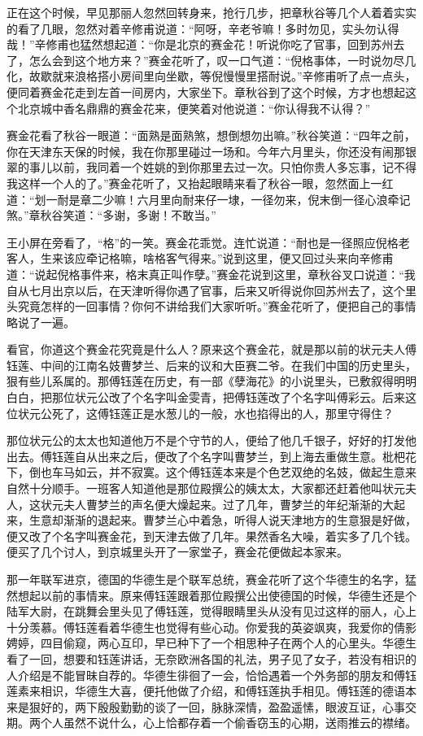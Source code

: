 \documentclass[12pt,UTF8]{ctexbook}
\begin{document}
{{{正在这个时候，早见那丽人忽然回转身来，抢行几步，把章秋谷等几个人着着实实的看了几眼，忽然对着辛修甫说道：“阿呀，辛老爷嘛！多时勿见，实头勿认得哉！”辛修甫也猛然想起道：“你是北京的赛金花！听说你吃了官事，回到苏州去了，怎么会到这个地方来？”赛金花听了，叹一口气道：“倪格事体，一时说勿尽几化，故歇就来浪格搭小房间里向坐歇，等倪慢慢里搭耐说。”辛修甫听了点一点头，便同着赛金花走到左首一间房内，大家坐下。章秋谷到了这个时候，方才也想起这个北京城中香名鼎鼎的赛金花来，便笑着对他说道：“你认得我不认得？”

赛金花看了秋谷一眼道：“面熟是面熟煞，想倒想勿出嘛。”秋谷笑道：“四年之前，你在天津东天保的时候，我在你那里碰过一场和。今年六月里头，你还没有闹那银翠的事儿以前，我同着一个姓姚的到你那里去过一次。只怕你贵人多忘事，记不得我这样一个人的了。”赛金花听了，又抬起眼睛来看了秋谷一眼，忽然面上一红道：“划一耐是章二少嘛！六月里向耐来仔一埭，一径勿来，倪末倒一径心浪牵记煞。”章秋谷笑道：“多谢，多谢！不敢当。”

王小屏在旁看了，“格”的一笑。赛金花乖觉。连忙说道：“耐也是一径照应倪格老客人，生来该应牵记格嘛，啥格客气得来。”说到这里，便又回过头来向辛修甫道：“说起倪格事件来，格末真正叫作孽。”赛金花说到这里，章秋谷叉口说道：“我自从七月出京以后，在天津听得你遇了官事，后来又听得说你回苏州去了，这个里头究竟怎样的一回事情？你何不讲给我们大家听听。”赛金花听了，便把自己的事情略说了一遍。

看官，你道这个赛金花究竟是什么人？原来这个赛金花，就是那以前的状元夫人傅钰莲、中间的江南名妓曹梦兰、后来的议和大臣赛二爷。在我们中国的历史里头，狠有些儿系属的。那傅钰莲在历史，有一部《孽海花》的小说里头，已敷叙得明明白白，把那位状元公改了个名字叫金雯青，把傅钰莲改了个名字叫傅彩云。后来这位状元公死了，这傅钰莲正是水葱儿的一般，水也掐得出的人，那里守得住？

那位状元公的太太也知道他万不是个守节的人，便给了他几千银子，好好的打发他出去。傅钰莲自从出来之后，便改了个名字叫曹梦兰，到上海去重做生意。枇杷花下，倒也车马如云，并不寂寞。这个傅钰莲本来是个色艺双绝的名妓，做起生意来自然十分顺手。一班客人知道他是那位殿撰公的姨太太，大家都还赶着他叫状元夫人，这状元夫人曹梦兰的声名便大燥起来。过了几年，曹梦兰的年纪渐渐的大起来，生意却渐渐的退起来。曹梦兰心中着急，听得人说天津地方的生意狠是好做，便又改了个名字叫赛金花，到天津去做了几年。果然香名大噪，着实多了几个钱。便买了几个讨人，到京城里头开了一家堂子，赛金花便做起本家来。

那一年联军进京，德国的华德生是个联军总统，赛金花听了这个华德生的名字，猛然想起以前的事情来。原来傅钰莲跟着那位殿撰公出使德国的时候，华德生还是个陆军大尉，在跳舞会里头见了傅钰莲，觉得眼睛里头从没有见过这样的丽人，心上十分羡慕。傅钰莲看着华德生也觉得有些心动。你爱我的英姿飒爽，我爱你的倩影娉婷，四目偷窥，两心互印，早已种下了一个相思种子在两个人的心里头。华德生看了一回，想要和钰莲讲话，无奈欧洲各国的礼法，男子见了女子，若没有相识的人介绍是不能冒昧自荐的。华德生徘徊了一会，恰恰遇着一个外务部的朋友和傅钰莲素来相识，华德生大喜，便托他做了介绍，和傅钰莲执手相见。傅钰莲的德语本来是狠好的，两下殷殷勤勤的谈了一回，脉脉深情，盈盈遥愫，眼波互证，心事交期。两个人虽然不说什么，心上恰都存着一个偷香窃玉的心期，送雨推云的襟绪。

}}}
\end{document}
